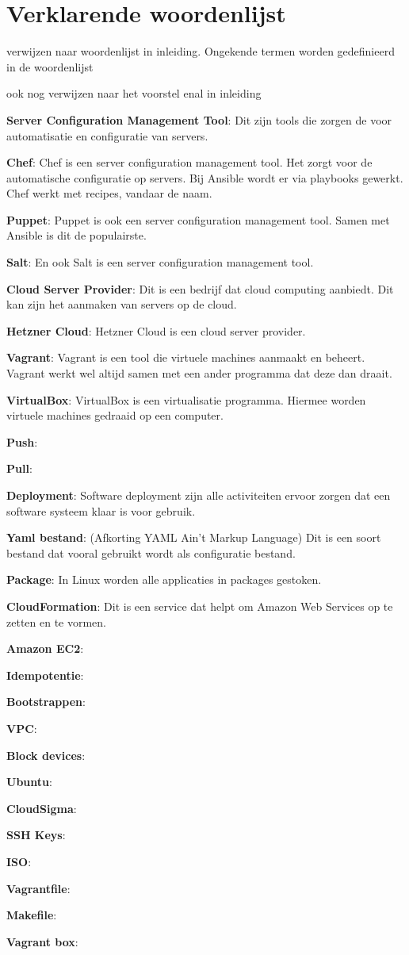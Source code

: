 \chapter{Verklarende woordenlijst}
verwijzen naar woordenlijst in inleiding. Ongekende termen worden gedefinieerd in de woordenlijst

ook nog verwijzen naar het voorstel enal in inleiding

\textbf{Server Configuration Management Tool}: Dit zijn tools die zorgen de voor automatisatie en configuratie van servers.

\textbf{Chef}: Chef is een server configuration management tool. Het zorgt voor de automatische configuratie op servers. Bij Ansible wordt er via playbooks gewerkt. Chef werkt met recipes, vandaar de naam.

\textbf{Puppet}: Puppet is ook een server configuration management tool. Samen met Ansible is dit de populairste.   

\textbf{Salt}: En ook Salt is een server configuration management tool.  

\textbf{Cloud Server Provider}: Dit is een bedrijf dat cloud computing aanbiedt. Dit kan zijn het aanmaken van servers op de cloud.

\textbf{Hetzner Cloud}: Hetzner Cloud is een cloud server provider.

\textbf{Vagrant}: Vagrant is een tool die virtuele machines aanmaakt en beheert. Vagrant werkt wel altijd samen met een ander programma dat deze dan draait.

\textbf{VirtualBox}: VirtualBox is een virtualisatie programma. Hiermee worden  virtuele machines gedraaid op een computer.

\textbf{Push}: 

\textbf{Pull}: 

\textbf{Deployment}: Software deployment zijn alle activiteiten ervoor zorgen dat een software systeem klaar is voor gebruik.

\textbf{Yaml bestand}: (Afkorting YAML Ain't Markup Language) Dit is een soort bestand dat vooral gebruikt wordt als configuratie bestand.

\textbf{Package}: In Linux worden alle applicaties in packages gestoken.

\textbf{CloudFormation}: Dit is een service dat helpt om Amazon Web Services op te zetten en te vormen.


\textbf{Amazon EC2}:

\textbf{Idempotentie}:

\textbf{Bootstrappen}:

\textbf{VPC}:

\textbf{Block devices}:

\textbf{Ubuntu}:

\textbf{CloudSigma}:

\textbf{SSH Keys}:

\textbf{ISO}:

\textbf{Vagrantfile}:

\textbf{Makefile}:

\textbf{Vagrant box}: